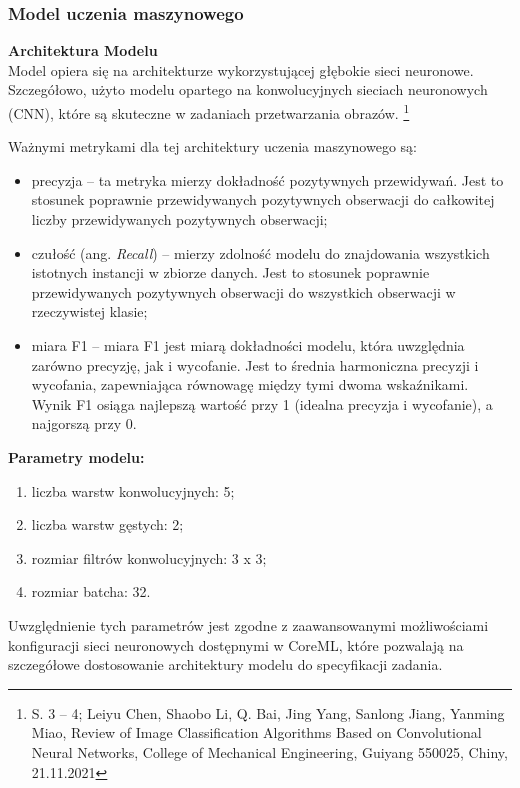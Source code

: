 \documentclass[12pt, a4paper, twoside, openany]{book}
\newcommand{\forceindent}{\leavevmode{\parindent=1.3em\indent}}
\begin{document}
\subsubsection{Model uczenia maszynowego}

\forceindent \textbf{Architektura Modelu\\}
\indent Model opiera się na architekturze wykorzystującej głębokie sieci neuronowe.
Szczegółowo, użyto modelu opartego na konwolucyjnych sieciach neuronowych (CNN), które są skuteczne w zadaniach przetwarzania obrazów. \footnote{
    S. 3 -- 4; Leiyu Chen, Shaobo Li, Q. Bai, Jing Yang, Sanlong Jiang, Yanming Miao, Review of Image Classification Algorithms Based on Convolutional Neural Networks, College of Mechanical Engineering, Guiyang 550025, Chiny, 21.11.2021
}

Ważnymi metrykami dla tej architektury uczenia maszynowego są:
\begin{itemize}[label=--]
    \item precyzja -- ta metryka mierzy dokładność pozytywnych przewidywań. Jest to stosunek poprawnie przewidywanych pozytywnych obserwacji do całkowitej liczby przewidywanych pozytywnych obserwacji;
    \item czułość (ang. \textit{Recall}) -- mierzy zdolność modelu do znajdowania wszystkich istotnych instancji w zbiorze danych. Jest to stosunek poprawnie przewidywanych pozytywnych obserwacji do wszystkich obserwacji w rzeczywistej klasie;
    \item miara F1 -- miara F1 jest miarą dokładności modelu, która uwzględnia zarówno precyzję, jak i wycofanie. Jest to średnia harmoniczna precyzji i wycofania, zapewniająca równowagę między tymi dwoma wskaźnikami. Wynik F1 osiąga najlepszą wartość przy 1 (idealna precyzja i wycofanie), a najgorszą przy 0.
\end{itemize}

\textbf{Parametry modelu:}
\begin{enumerate}[label=--]
    \item liczba warstw konwolucyjnych: 5;
    \item liczba warstw gęstych: 2;
    \item rozmiar filtrów konwolucyjnych: 3 x 3;
    \item rozmiar batcha: 32.
\end{enumerate}
\forceindent Uwzględnienie tych parametrów jest zgodne z zaawansowanymi możliwościami konfiguracji sieci neuronowych dostępnymi w CoreML, które pozwalają na szczegółowe dostosowanie architektury modelu do specyfikacji zadania.
\end{document}
